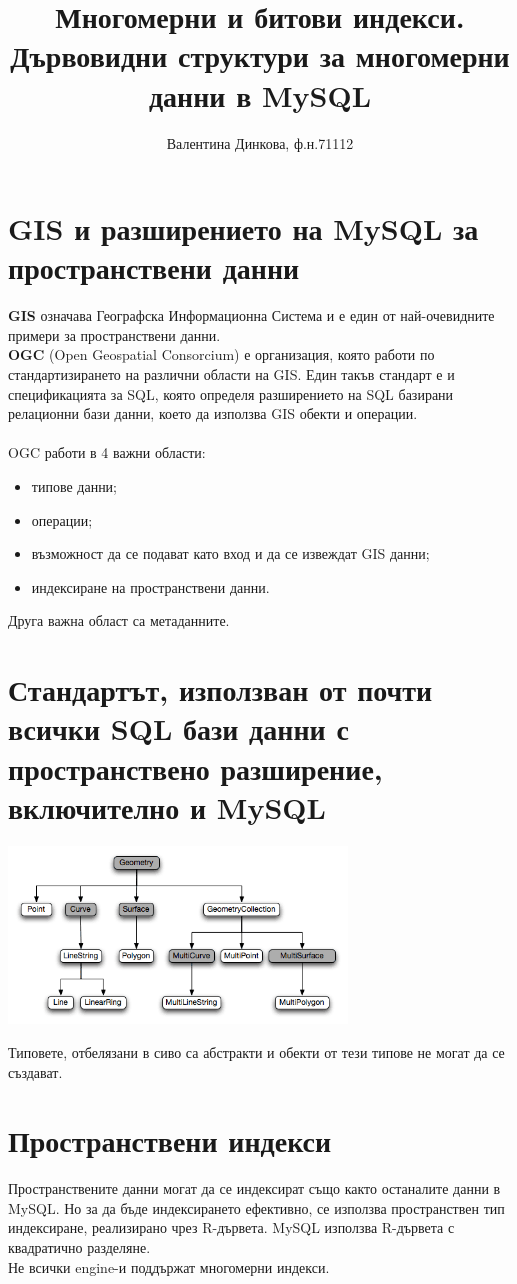 \documentclass[a4paper,10pt]{article}
\title{Многомерни и битови индекси. Дървовидни структури за многомерни данни в MySQL}
\author{Валентина Динкова, ф.н.71112}
\begin{document}
\maketitle

\newpage
\section{GIS и разширението на MySQL за пространствени данни}
\textbf{GIS} означава Географска Информационна Система и е един от най-очевидните примери за пространствени данни.
\\
\textbf{OGC} (Open Geospatial Consorcium) е организация, която работи по стандартизирането на различни области на GIS.
Един такъв стандарт е и спецификацията за SQL, която определя разширението на SQL базирани релационни бази данни,
 което да използва GIS обекти и операции.
\\
\\
 OGC работи в 4 важни области:
\begin{itemize}
 \item типове данни;
 \item операции;
 \item възможност да се подават като вход и да се извеждат GIS данни;
 \item индексиране на пространствени данни.
\end{itemize}
Друга важна област са метаданните.
\\
\section{Стандартът, използван от почти всички SQL бази данни с пространствено разширение, включително и MySQL}
\begin{center}
\includegraphics[width=90mm]{gis-datatypes.png}\end{center}
Типовете, отбелязани в сиво са абстракти и обекти от тези типове не могат да се създават.

\section{Пространствени индекси}
Пространствените данни могат да се индексират също както останалите данни в MySQL. Но за да бъде 
индексирането ефективно, се използва пространствен тип индексиране, реализирано чрез R-дървета. 
MySQL използва R-дървета с квадратично разделяне. \\
Не всички engine-и поддържат многомерни индекси.
\end{document}
